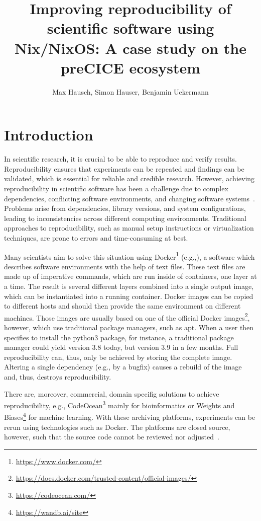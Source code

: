 \documentclass{eceasst}
\title{Improving reproducibility of scientific software using Nix/NixOS: A case study on the preCICE ecosystem}
\author{
Max Hausch\autref{1}\autref{*},
Simon Hauser\autref{1}\autref{*},
Benjamin Uekermann\autref{1}}
\institute{
\autlabel{1} Institute for Parallel and Distributed Systems\\ University of Stuttgart\\ \email{benjamin.uekermann@ipvs.uni-stuttgart.de}\\
\autlabel{*} These authors contributed equally to this work.}
\begin{document}
\maketitle

\section{Introduction}

In scientific research, it is crucial to be able to reproduce and verify results.
Reproducibility ensures that experiments can be repeated and findings can be validated, which is essential for reliable and credible research.
However, achieving reproducibility in scientific software has been a challenge due to complex dependencies, conflicting software environments, and changing software systems~\cite{Dalle_2012}.
Problems arise from dependencies, library versions, and system configurations, leading to inconsistencies across different computing environments.
Traditional approaches to reproducibility, such as manual setup instructions or virtualization techniques, are prone to errors and time-consuming at best.

Many scientists aim to solve this situation using Docker\footnote{\url{https://www.docker.com/}} (e.g.,\cite{koch2023sustainable}),
a software which describes software environments with the help of text files.
These text files are made up of imperative commands, which are run inside of containers, one layer at a time.
The result is several different layers combined into a single output image, which can be instantiated into a running container.
Docker images can be copied to different hosts and should then provide the same environment on different machines.
Those images are usually based on one of the official Docker images\footnote{\url{https://docs.docker.com/trusted-content/official-images/}}, however, which use traditional package managers, such as apt.
When a user then specifies to install the python3 package, for instance, a traditional package manager could yield version 3.8 today, but version 3.9 in a few months.
Full reproducibility can, thus, only be achieved by storing the complete image. Altering a single dependency (e.g., by a bugfix) causes a rebuild of the image and, thus, destroys reproducibility.

There are, moreover, commercial, domain specifig solutions to achieve reproducibility, e.g., CodeOcean\footnote{\url{https://codeocean.com/}} mainly for bioinformatics or Weights and Biases\footnote{\url{https://wandb.ai/site}} for machine learning.
With these archiving platforms, experiments can be rerun using technologies such as Docker.
The platforms are closed source, however, such that the source code cannot be reviewed nor adjusted~\cite{koch2023sustainable}.
\end{document}
